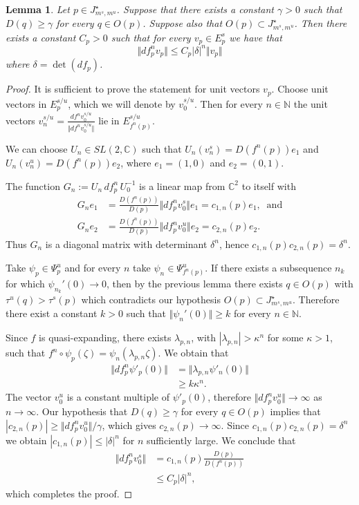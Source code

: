 \documentclass[10pt,a4paper]{article}
\newtheorem{lemma}[theorem]{Lemma}
\begin{document}
\begin{lemma}
Let $p\in J^\star_{m^s,m^u}$. Suppose that there exists a constant $\gamma>0$ such that $D(q)\geq \gamma$ for every $q\in O(p)$. Suppose also that $O(p)\subset J^\star_{m^s,m^u}$. Then there exists a constant $C_p>0$ such that for every $v_p\in E^s_p$ we have that
\[
\Vert df^n_pv_p\Vert\leq C_p |\delta|^n\Vert v_p\Vert
\]
where $\delta=\det(df_p)$.
\end{lemma}
\begin{proof}
It is sufficient to prove the statement for unit vectors $v_p$. Choose unit vectors in $E^{s/u}_p$, which we will denote by $v^{s/u}_0$. Then for every $n\in \mathbb N$ the unit vectors $v_n^{s/u}=\frac{df^nv^{s/u}_0}{\Vert df^nv^{s/u}_0\Vert}$ lie in $E^{s/u}_{f^n(p)}$.

We can choose $U_n\in SL(2,\mathbb C)$ such that $U_n(v^s_n)=D(f^n(p)) e_1$ and $U_n(v^u_n)=D(f^n(p)) e_2$, where $e_1=(1,0)$ and $e_2=(0,1)$.

The function $G_n:=U_n\, df^n_p\,U_0^{-1}$ is a linear map from $\mathbb C^2$ to itself with
\begin{align*}
G_ne_1&=\frac{D(f^n(p))}{D(p)}\Vert df^n_p v_0^s\Vert e_1=c_{1,n}(p)e_1, \; \; \mathrm{and}\\
G_ne_2&=\frac{D(f^n(p))}{D(p)}\Vert df^n_p v_0^u\Vert e_2=c_{2,n}(p)e_2.
\end{align*}
Thus $G_n$ is a diagonal matrix with determinant $\delta^n$, hence $c_{1,n}(p)c_{2,n}(p)=\delta^n$.

Take $\psi_p\in\Psi^u_p$ and for every $n$ take $\psi_n\in\Psi^u_{f^n(p)}$. If there exists a subsequence $n_k$ for which $\psi_{n_k}'(0)\to 0$, then by the previous lemma there exists $q\in O(p)$ with $\tau^u(q)>\tau^s(p)$ which contradicts our hypothesis $O(p) \subset J^\star_{m^s,m^u}$. Therefore there exist a constant $k>0$ such that $\Vert\psi_n'(0)\Vert\geq k$ for every $n\in \mathbb N$.

Since $f$ is quasi-expanding, there exists $\lambda_{p,n}$, with $|\lambda_{p,n}|>\kappa^n$ for some $\kappa>1$, such that $f^n\circ\psi_p(\zeta)=\psi_n(\lambda_{p,n}\zeta)$. We obtain that
\begin{align*}
\Vert df^n_p\psi'_p(0)\Vert&= \Vert\lambda_{p,n}\psi'_n(0)\Vert\\
&\geq k\kappa^n.
\end{align*}
The vector $v^u_0$ is a constant multiple of $\psi'_p(0)$, therefore $\Vert df_p^n v_0^u\Vert\to \infty$ as $n\to\infty$. Our hypothesis that $D(q) \ge \gamma$ for every $q \in O(p)$ implies that $|c_{2,n}(p)|\geq \Vert df_p^nv_0^u\Vert/\gamma$, which gives $c_{2,n}(p)\to \infty$. Since $c_{1,n}(p) c_{2,n}(p) = \delta^n$ we obtain $|c_{1,n}(p)|\leq|\delta|^n$ for $n$ sufficiently large. We conclude that
\begin{align*}
\Vert df_p^n v^s_0\Vert&=c_{1,n}(p)\frac{D(p)}{D(f^n(p))}\\
&\leq C_p|\delta|^n,
\end{align*}
which completes the proof.
\end{proof}
\end{document}

